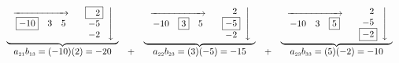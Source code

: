 \documentclass{ximera}
\begin{document}
\[ \begin{array}{ccccc}

\underbrace{\begin{array}{rl} \stackrel{\xrightarrow{\hspace{.75in}}}{\begin{array}{ccc} \fbox{$-10$} &  3 & 5 \end{array}} & \left. \begin{array}{c} \fbox{\hphantom{$-$}2}  \\ -5   \\ -2  \\ \end{array} \right\downarrow \\ \end{array}}

&

&

\underbrace{\begin{array}{rl} \stackrel{\xrightarrow{\hspace{.75in}}}{\begin{array}{ccc} -10 & \fbox{3} & 5 \end{array}} &  \left.  \begin{array}{c} \hphantom{-}2 \\ \fbox{$-5$}    \\ -2  \\ \end{array} \right\downarrow \\\end{array}}

& 


&


\underbrace{\begin{array}{rl} \stackrel{\xrightarrow{\hspace{.75in}}}{\begin{array}{ccc} -10 & 3 & \fbox{$5$} \end{array}} &  \left. \begin{array}{c} \hphantom{-}2 \\ -5 \\ \fbox{$-2$}   \\ \end{array} \right\downarrow \\ \end{array}}   \\

a_{\mbox{\tiny$21$}}b_{\mbox{\tiny$13$}}= (-10)(2) = -20 & + & a_{\mbox{\tiny$22$}}b_{\mbox{\tiny$23$}} = (3)(-5)  = -15 & + & a_{\mbox{\tiny$23$}}b_{\mbox{\tiny$33$}} = (5)(-2)  = -10 \\

\end{array}\]
\end{document}
